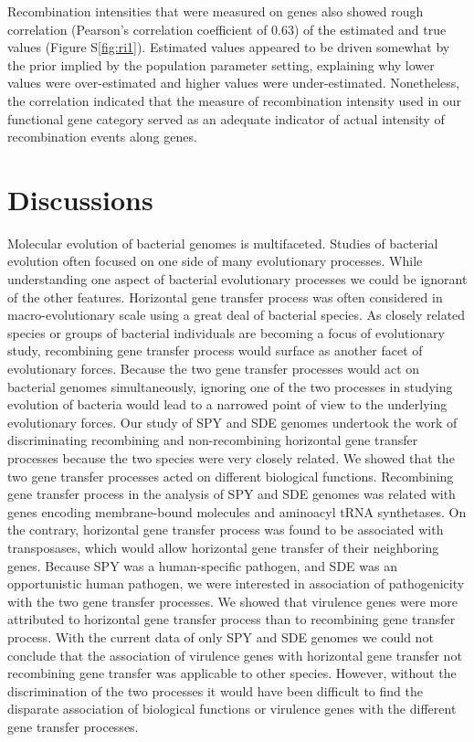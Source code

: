 \documentclass[10pt]{article}
\begin{document}
Recombination intensities that were measured on genes also showed rough
correlation (Pearson's correlation coefficient of 0.63) of the estimated and
true values (Figure S\ref{fig:ri1}).  Estimated values appeared to be driven
somewhat by the prior implied by the population parameter setting, explaining
why lower values were over-estimated and higher values were under-estimated.
Nonetheless, the correlation indicated that the measure of recombination
intensity used in our functional gene category served as an adequate indicator
of actual intensity of recombination events along genes.



\section*{Discussions}

Molecular evolution of bacterial genomes is multifaceted. Studies of bacterial
evolution often focused on one side of many evolutionary processes.  While
understanding one aspect of bacterial evolutionary processes we could be
ignorant of the other features.  Horizontal gene transfer process was often
considered in macro-evolutionary scale using a great deal of bacterial species.
As closely related species or groups of bacterial individuals are becoming a
focus of evolutionary study, recombining gene transfer process would surface as
another facet of evolutionary forces.  Because the two gene transfer processes
would act on bacterial genomes simultaneously, ignoring one of the two processes
in studying evolution of bacteria would lead to a narrowed point of view to the
underlying evolutionary forces. Our study of SPY and SDE genomes undertook the
work of discriminating recombining and non-recombining horizontal gene transfer
processes because the two species were very closely related.  We showed that the
two gene transfer processes acted on different biological functions. Recombining
gene transfer process in the analysis of SPY and SDE genomes was related with
genes encoding membrane-bound molecules and aminoacyl tRNA synthetases. On the
contrary, horizontal gene transfer process was found to be associated with
transposases, which would allow horizontal gene transfer of their neighboring
genes.  Because SPY was a human-specific pathogen, and SDE was an opportunistic
human pathogen, we were interested in association of pathogenicity with the two
gene transfer processes. We showed that virulence genes were more attributed to
horizontal gene transfer process than to recombining gene transfer process.
With the current data of only SPY and SDE genomes we could not conclude that the
association of virulence genes with horizontal gene transfer not recombining
gene transfer was applicable to other species.  However, without the
discrimination of the two processes it would have been difficult to find the
disparate association of biological functions or virulence genes with the
different gene transfer processes. 
\end{document}
